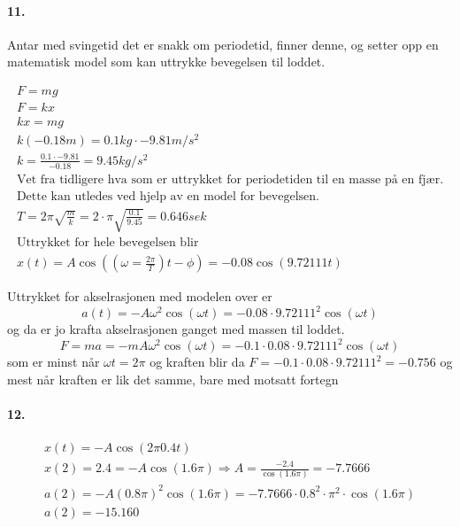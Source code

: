 \documentclass[11pt, A4paper,norsk]{article}
\begin{document}
		\paragraph{11.}
			\begin{flushleft}
Antar med svingetid det er snakk om periodetid, finner denne, og setter opp en matematisk model som kan uttrykke bevegelsen til loddet.
			\end{flushleft}
			\begin{gather}
F = mg \\
F = kx \\
kx = mg \\
k(-0.18m) = 0.1kg \cdot - 9.81m/s^2 \\
k = \frac{0.1 \cdot - 9.81}{- 0.18} = 9.45 kg/s^2 \\
\text{Vet fra tidligere hva som er uttrykket for periodetiden til en masse på en fjær.} \nonumber \\
\text{Dette kan utledes ved hjelp av en model for bevegelsen.} \nonumber \\
T = 2 \pi \sqrt{\frac{m}{k}} = 2 \cdot \pi \sqrt{\frac{0.1}{9.45}} = 0.646 sek \\
\text{Uttrykket for hele bevegelsen blir} \nonumber \\
x(t) = A \cos \left( \left(\omega = \frac{2 \pi}{T}\right) t - \phi \right) = - 0.08 \cos \left( 9.72111 t \right)
			\end{gather}
			\begin{flushleft}
Uttrykket for akselrasjonen med modelen over er $$a(t) = -A\omega^2 \cos(\omega t) = -0.08 \cdot 9.72111^2 \cos(\omega t)$$ og da er jo krafta akselrasjonen ganget med massen til loddet. $$F = ma = - m A \omega^2 \cos(\omega t) = - 0.1 \cdot 0.08 \cdot 9.72111^2 \cos(\omega t)$$ som er minst når $\omega t = 2 \pi$ og kraften blir da $F = - 0.1 \cdot 0.08 \cdot 9.72111^2 = -0.756$ og mest når kraften er lik det samme, bare med motsatt fortegn
			\end{flushleft}








		\paragraph{12.}
			\begin{gather}
x(t) = -A \cos \left( 2 \pi 0.4 t \right) \\
x(2) = 2.4 = -A \cos \left( 1.6 \pi \right) \Rightarrow A = \frac{- 2.4}{\cos(1.6 \pi)} = -7.7666 \\
a(2) = -A(0.8 \pi)^2 \cos (1.6\pi) = - 7.7666 \cdot 0.8^2 \cdot \pi^2 \cdot \cos (1.6\pi) \\
a(2) = - 15.160
			\end{gather}
\end{document}
